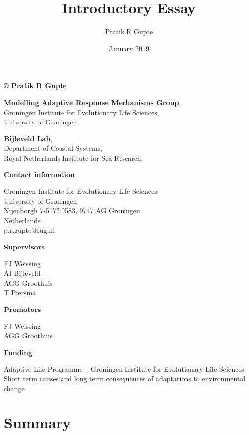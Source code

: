 \title{\huge{Introductory Essay}}
\author{\large{Pratik R Gupte}}
\date{January 2019}



\newpage

\textbf{© Pratik R Gupte}

\textbf{Modelling Adaptive Response Mechanisms Group},\\
Groningen Institute for Evolutionary Life Sciences,\\
University of Groningen.

\textbf{Bijleveld Lab},\\
Department of Coastal Systems,\\
Royal Netherlands Institute for Sea Research.

\textbf{Contact information}

Groningen Institute for Evolutionary Life Sciences\\
University of Groningen\\
Nijenborgh 7-5172.0583, 9747 AG Groningen\\
Netherlands\\
p.r.gupte@rug.nl

\textbf{Supervisors}

FJ Weissing\\
AI Bijleveld\\
AGG Groothuis\\
T Piersma

\textbf{Promotors}

FJ Weissing\\
AGG Groothuis

\textbf{Funding}

Adaptive Life Programme -- Groningen Institute for Evolutionary Life
Sciences\\
Short term causes and long term consequences of adaptations to
environmental change

\newpage

\tableofcontents

\newpage

\part*{Summary}\label{part:Summary}

